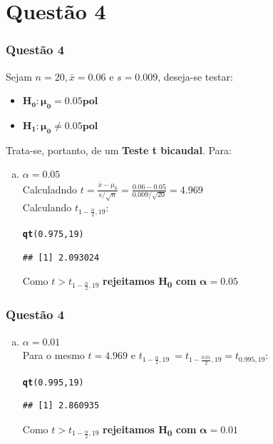 \documentclass{beamer}\usepackage[]{graphicx}\usepackage[]{color}
\makeatletter
\newcommand{\hlnum}[1]{\textcolor[rgb]{0.686,0.059,0.569}{#1}}%
\newcommand{\hlstd}[1]{\textcolor[rgb]{0.345,0.345,0.345}{#1}}%
\newcommand{\hlkwd}[1]{\textcolor[rgb]{0.737,0.353,0.396}{\textbf{#1}}}%
\newenvironment{kframe}{%
 \def\at@end@of@kframe{}%
 \ifinner\ifhmode%
  \def\at@end@of@kframe{\end{minipage}}%
  \begin{minipage}{\columnwidth}%
 \fi\fi%
 \def\FrameCommand##1{\hskip\@totalleftmargin \hskip-\fboxsep
 \colorbox{shadecolor}{##1}\hskip-\fboxsep
     \hskip-\linewidth \hskip-\@totalleftmargin \hskip\columnwidth}%
 \MakeFramed {\advance\hsize-\width
   \@totalleftmargin\z@ \linewidth\hsize
   \@setminipage}}%
 {\par\unskip\endMakeFramed%
 \at@end@of@kframe}
\newenvironment{knitrout}{}{} %
\makeatother
\begin{document}
	\section{Questão 4}
	\begin{frame}[fragile]
			\frametitle{Questão 4}
			Sejam $n = 20, \bar{x} = 0.06$ e $s = 0.009$, deseja-se testar:
			\begin{itemize}
				\item $\boldsymbol{H_{0}:  \mu_{0} = 0.05pol}$
				\item $\boldsymbol{H_{1}:  \mu_{0} \neq 0.05pol}$
			\end{itemize}
			Trata-se, portanto, de um \textbf{Teste t bicaudal}.  Para:
			\begin{enumerate}[a)]
				\item $\alpha = 0.05$\\
				Calculadndo $t = \frac{\bar{x} - \mu_{0}}{s/\sqrt{n}} = \frac{0.06 - 0.05}{0.009/\sqrt{20}} = 4.969$\\
				Calculando $t_{1-\frac{\alpha}{2},19}$:
\begin{knitrout}
\color{fgcolor}\begin{kframe}
\begin{alltt}
\hlkwd{qt}\hlstd{(}\hlnum{0.975}\hlstd{,}\hlnum{19}\hlstd{)}
\end{alltt}
\begin{verbatim}
## [1] 2.093024
\end{verbatim}
\end{kframe}
\end{knitrout}
                        Como $t > t_{1-\frac{\alpha}{2},19} $ \textbf{rejeitamos H\textsubscript{0} com} $\boldsymbol{\alpha = 0.05}$
			\end{enumerate}
		\end{frame}
		
		\begin{frame}[fragile]
			\frametitle{Questão 4}
			\begin{enumerate}[b)]
				\item $\alpha  = 0.01$\\
				Para o mesmo $t = 4.969$ e $t_{1-\frac{\alpha}{2},19} \ = t_{1-\frac{0.01}{2},19} = t_{0.995,19} $:
\begin{knitrout}
\color{fgcolor}\begin{kframe}
\begin{alltt}
\hlkwd{qt}\hlstd{(}\hlnum{0.995}\hlstd{,}\hlnum{19}\hlstd{)}
\end{alltt}
\begin{verbatim}
## [1] 2.860935
\end{verbatim}
\end{kframe}
\end{knitrout}
			Como $t > t_{1-\frac{\alpha}{2},19}$ \textbf{rejeitamos H\textsubscript{0} com} $\boldsymbol{\alpha = 0.01}$
			\end{enumerate}
		\end{frame}
		
\end{document}
